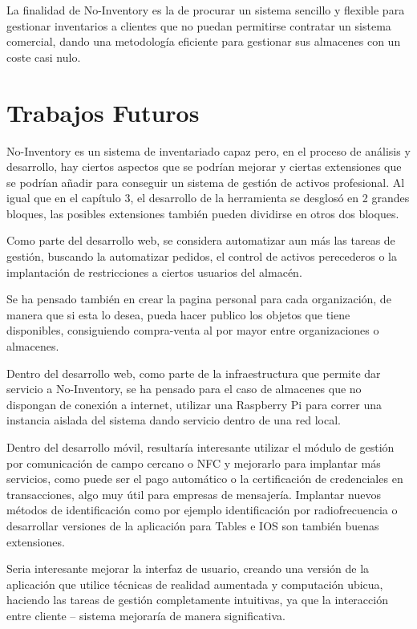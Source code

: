 \documentclass[a4paper,11pt]{book}
\begin{document}
La finalidad de No-Inventory es la de procurar un sistema sencillo y flexible para gestionar inventarios  a clientes que no puedan permitirse contratar un sistema comercial, dando una metodología eficiente para gestionar sus almacenes con un coste casi nulo. 

\section{Trabajos Futuros}
No-Inventory es un sistema de inventariado capaz pero, en el proceso de análisis y desarrollo, hay ciertos aspectos que se podrían mejorar y ciertas extensiones que se podrían añadir para conseguir un sistema de gestión de activos profesional. Al igual que en el capítulo 3, el desarrollo de la herramienta se desglosó en 2 grandes bloques, las posibles extensiones también pueden dividirse en otros dos bloques. 


Como parte del desarrollo web, se considera automatizar aun más las tareas de gestión, buscando la automatizar pedidos, el control de activos perecederos o la implantación de restricciones a ciertos usuarios del almacén.

Se ha pensado también en crear la pagina personal para cada organización, de manera que si esta lo desea, pueda hacer publico los objetos que tiene disponibles, consiguiendo compra-venta al por mayor entre organizaciones o almacenes. 
	
Dentro del desarrollo web, como parte de la infraestructura que permite dar servicio a No-Inventory, se ha pensado para el caso de almacenes que no dispongan de conexión a internet, utilizar una Raspberry Pi para correr una instancia aislada del sistema dando servicio dentro de una red local. 


Dentro del desarrollo móvil, resultaría interesante utilizar el módulo de gestión por comunicación de campo cercano o NFC y mejorarlo para implantar más servicios, como puede ser el pago automático o la certificación de credenciales en transacciones, algo  muy útil para empresas de mensajería. Implantar nuevos métodos de identificación como por ejemplo identificación por radiofrecuencia  o desarrollar versiones de la aplicación para Tables e IOS son también buenas extensiones.  

Seria interesante mejorar la interfaz de usuario, creando una versión de la aplicación que utilice técnicas de realidad aumentada y computación ubicua,  haciendo las tareas de gestión completamente intuitivas, ya que la interacción entre cliente – sistema mejoraría de manera significativa. 
\end{document}
